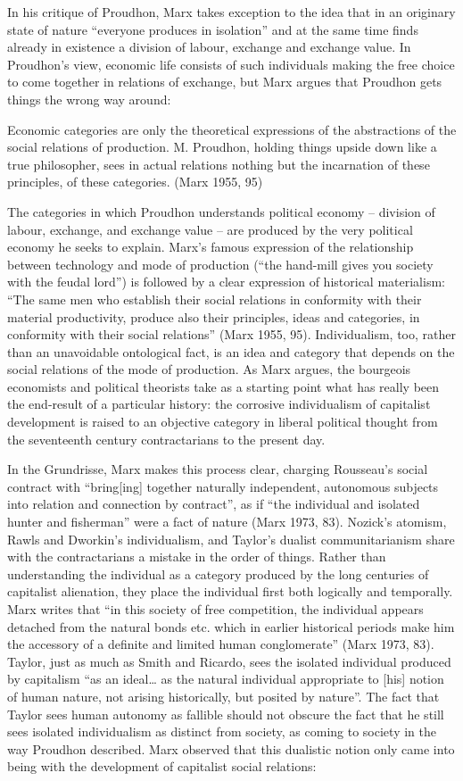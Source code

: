 \documentclass[12pt,oneside]{memoir}
\begin{document}
In his critique of Proudhon, Marx takes exception to the idea that in an originary state of nature ``everyone produces in isolation'' and at the same time finds already in existence a division of labour, exchange and exchange value. In Proudhon's view, economic life consists of such individuals making the free choice to come together in relations of exchange, but Marx argues that Proudhon gets things the wrong way around:

Economic categories are only the theoretical expressions of the abstractions of the social relations of production. M. Proudhon, holding things upside down like a true philosopher, sees in actual relations nothing but the incarnation of these principles, of these categories. (Marx 1955, 95)

The categories in which Proudhon understands political economy -- division of labour, exchange, and exchange value -- are produced by the very political economy he seeks to explain. Marx's famous expression of the relationship between technology and mode of production (``the hand-mill gives you society with the feudal lord'') is followed by a clear expression of historical materialism: ``The same men who establish their social relations in conformity with their material productivity, produce also their principles, ideas and categories, in conformity with their social relations'' (Marx 1955, 95). Individualism, too, rather than an unavoidable ontological fact, is an idea and category that depends on the social relations of the mode of production. As Marx argues, the bourgeois economists and political theorists take as a starting point what has really been the end-result of a particular history: the corrosive individualism of capitalist development is raised to an objective category in liberal political thought from the seventeenth century contractarians to the present day.

	In the Grundrisse, Marx makes this process clear, charging Rousseau's social contract with ``bring[ing] together naturally independent, autonomous subjects into relation and connection by contract'', as if ``the individual and isolated hunter and fisherman'' were a fact of nature (Marx 1973, 83). Nozick's atomism, Rawls and Dworkin's individualism, and Taylor's dualist communitarianism share with the contractarians a mistake in the order of things. Rather than understanding the individual as a category produced by the long centuries of capitalist alienation, they place the individual first both logically and temporally. Marx writes that ``in this society of free competition, the individual appears detached from the natural bonds etc. which in earlier historical periods make him the accessory of a definite and limited human conglomerate'' (Marx 1973, 83). Taylor, just as much as Smith and Ricardo, sees the isolated individual produced by capitalism ``as an ideal{\ldots} as the natural individual appropriate to [his] notion of human nature, not arising historically, but posited by nature''. The fact that Taylor sees human autonomy as fallible should not obscure the fact that he still sees isolated individualism as distinct from society, as coming to society in the way Proudhon described. Marx observed that this dualistic notion only came into being with the development of capitalist social relations: 
\end{document}
